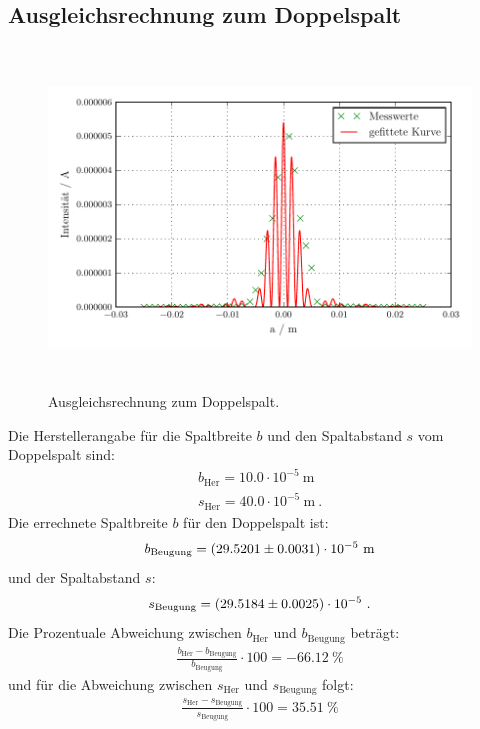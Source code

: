 \subsection{Ausgleichsrechnung zum Doppelspalt}
\begin{figure}[H] %
  \centering
  \includegraphics[height=9cm]{build/plot4.pdf}
  \caption{Ausgleichsrechnung zum Doppelspalt.}
  \label{fig:Doppel}
\end{figure}

Die Herstellerangabe für die Spaltbreite $b$ und den Spaltabstand $s$ vom Doppelspalt sind:
\begin{align*}
  b_\text{Her} = 10.0 \cdot 10^{-5} \ \text{m} \\
  s_\text{Her} = 40.0 \cdot 10^{-5} \ \text{m} \ .
\end{align*}
Die errechnete Spaltbreite $b$ für den Doppelspalt ist:
\begin{align*}
  b_\text{Beugung} = (\num{29.5201 +- 0.0031}) \cdot 10^{-5} \ \text{m}
\end{align*}
und der Spaltabstand $s$:
\begin{align*}
  s_\text{Beugung} = (\num{29.5184 +- 0.0025}) \cdot 10^{-5} \ .
\end{align*}
Die Prozentuale Abweichung zwischen $b_\text{Her}$ und $b_\text{Beugung}$ beträgt:
\begin{align*}
  \frac{b_\text{Her}-b_\text{Beugung}}{b_\text{Beugung}} \cdot 100 = -66.12 \ \%
\end{align*}
und für die Abweichung zwischen $s_\text{Her}$ und $s_\text{Beugung}$ folgt:
\begin{align*}
  \frac{s_\text{Her}-s_\text{Beugung}}{s_\text{Beugung}} \cdot 100 = 35.51 \ \%
\end{align*}
